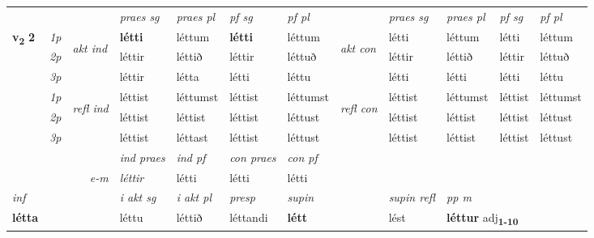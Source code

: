 \begin{longtable}[l]{X>{\footnotesize\itshape}llXXXXlXXXX}
 & &   & \textit{praes sg}  & \textit{praes pl}    & \textit{ pf sg} & \textit{pf pl} & & \textit{praes sg}  & \textit{praes pl}    & \textit{pf sg} & \textit{pf pl }  \\ \cmidrule{4-7} \cmidrule{9-12}
 \multirow{2}{*}{{{\textbf{v{\textsubscript{2}}} \Large{\textbf{2}}}}}  & 1p & \multirow{3}{*}{\begin{turn}{90}\textit{akt ind}\end{turn}} & \textbf{létti} & léttum & \textbf{létti} & léttum & \multirow{3}{*}{\begin{turn}{90}\textit{akt con}\end{turn}} &létti & léttum & létti & léttum\\*
 & 2p &  &  léttir  & léttið & léttir & léttuð & & léttir & léttið & léttir & léttuð \\*
 & 3p &  & léttir & létta & létti & léttu & & létti & létti& létti & léttu \\*
\cmidrule{4-7} \cmidrule{9-12}
 & 1p & \multirow{3}{*}{\begin{turn}{90}\textit{refl ind}\end{turn}}  & léttist & léttumst & léttist & léttumst & \multirow{3}{*}{\begin{turn}{90}\textit{refl con}\end{turn}}  &léttist & léttumst & léttist & léttumst \\*
 & 2p &  & léttist & léttist & léttist & léttust & &léttist & léttist & léttist & léttust \\*
 & 3p  & & léttist & léttast & léttist & léttust & & léttist & léttist& léttist & léttust \\*
\cmidrule{4-7} \cmidrule{9-12}

   && &  \textit{ind praes} & \textit{ind pf} & \textit{con praes} & \textit{con pf} \\*
\multicolumn{3}{r}{\textit{e-m}} & léttir & létti & létti & létti \\*

\cmidrule{4-7}
   {\textit{inf}} & &  & \textit{i akt sg} & \textit{i akt pl}   & \textit{presp} & \textit{supin} && \textit{supin refl} & \textit{pp m} \\*
  {\textbf{létta}} & && léttu  & léttið   & léttandi &  \textbf{létt} && lést & \multicolumn{2}{l}{\textbf{léttur} adj\textbf{\textsubscript{1-10}}} \\*

\midrule


\end{longtable}

